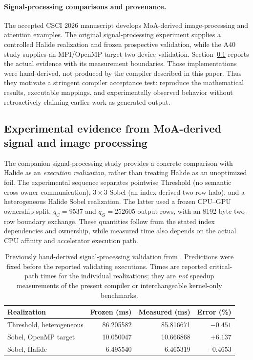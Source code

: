 \documentclass[11pt]{article}
\begin{document}
\paragraph{Signal-processing comparisons and provenance.}
The accepted CSCI 2026 manuscript \cite{csci} develops MoA-derived image-processing and attention examples. The original signal-processing experiment \cite{signal2026} supplies a controlled Halide realization and frozen prospective validation, while the A40 study \cite{a40report} supplies an MPI/OpenMP-target two-device validation. Section~\ref{sec:signal-evidence} reports the actual evidence with its measurement boundaries. Those implementations were hand-derived, not produced by the compiler described in this paper. Thus they motivate a stringent compiler acceptance test: reproduce the mathematical results, executable mappings, and experimentally observed behavior without retroactively claiming earlier work as generated output.


\subsection{Experimental evidence from MoA-derived signal and image processing}
\label{sec:signal-evidence}
The companion signal-processing study \cite{signal2026} provides a concrete comparison with Halide as an \emph{execution realization}, rather than treating Halide as an unoptimized foil. The experimental sequence separates pointwise Threshold (no semantic cross-owner communication), $3\times3$ Sobel (an index-derived two-row halo), and a heterogeneous Halide Sobel realization. The latter used a frozen CPU--GPU ownership split, $q_C=9537$ and $q_G=252605$ output rows, with an 8192-byte two-row boundary exchange. These quantities follow from the stated index dependencies and ownership, while measured time also depends on the actual CPU affinity and accelerator execution path.

\begin{table}[htbp]\centering\small
\caption{Previously hand-derived signal-processing validation from \cite{signal2026}. Predictions were fixed before the reported validating executions. Times are reported critical-path times for the individual realizations; they are \emph{not} speedup measurements of the present compiler or interchangeable kernel-only benchmarks.}\label{tab:signal-evidence}
\begin{tabular}{p{.29\linewidth}rrr}\toprule
Realization & Frozen (ms) & Measured (ms) & Error (\%)\\\midrule
Threshold, heterogeneous & 86.205582 & 85.816671 & $-0.451$\\
Sobel, OpenMP target & 10.050047 & 10.666868 & $+6.137$\\
Sobel, Halide & 6.495540 & 6.465319 & $-0.4653$\\\bottomrule
\end{tabular}
\end{table}
\end{document}
